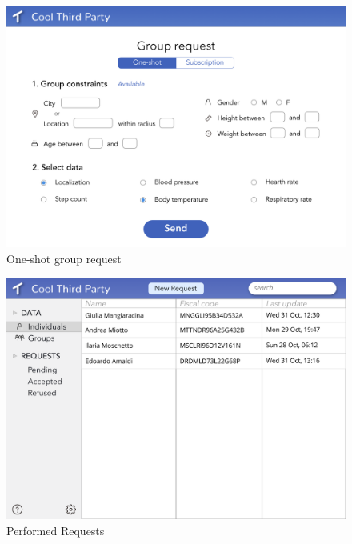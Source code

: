 \begin{figure}[H]
    \centering
    \includegraphics[scale=0.2]{rasdL/Pictures/Mockup/web/group1.png}
    \caption{One-shot group request}
\end{figure}
\begin{figure}[H]
    \centering
    \includegraphics[scale=0.2]{rasdL/Pictures/Mockup/web/individuals-data.png}
    \caption{Performed Requests}
\end{figure}




